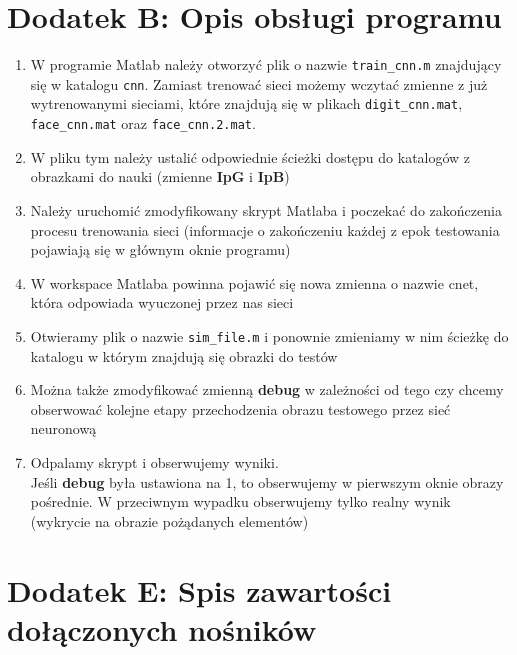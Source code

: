 \documentclass[11pt,a4paper]{article}
\begin{document}
\section{Dodatek B: Opis obsługi programu}
 \begin{enumerate}
\item W programie Matlab należy otworzyć plik o nazwie \verb#train_cnn.m# znajdujący się w katalogu \verb#cnn#. Zamiast trenować sieci możemy wczytać zmienne z już wytrenowanymi sieciami, które znajdują się w plikach \verb#digit_cnn.mat#, \verb#face_cnn.mat# oraz \verb#face_cnn.2.mat#.
\item W pliku tym należy ustalić odpowiednie ścieżki dostępu do katalogów z obrazkami do nauki (zmienne  \textbf{IpG} i  \textbf{IpB})
\item Należy uruchomić zmodyfikowany skrypt Matlaba i poczekać do zakończenia procesu trenowania sieci 
(informacje o zakończeniu każdej z epok testowania pojawiają się w głównym oknie programu)
\item W workspace Matlaba powinna pojawić się nowa zmienna o nazwie cnet, która odpowiada wyuczonej przez nas sieci
\item Otwieramy plik o nazwie \verb#sim_file.m# i ponownie zmieniamy w nim ścieżkę do katalogu w którym znajdują się
obrazki do testów
\item Można także zmodyfikować zmienną  \textbf{debug} w zależności od tego czy chcemy obserwować kolejne
 etapy przechodzenia  obrazu testowego przez sieć neuronową
\item Odpalamy skrypt i obserwujemy wyniki.\\
Jeśli \textbf{debug} była ustawiona na 1, to obserwujemy w pierwszym oknie obrazy pośrednie. W przeciwnym wypadku
obserwujemy tylko realny wynik (wykrycie na obrazie pożądanych elementów)

 \end{enumerate}
\section{Dodatek E: Spis zawartości dołączonych nośników}
\end{document}
